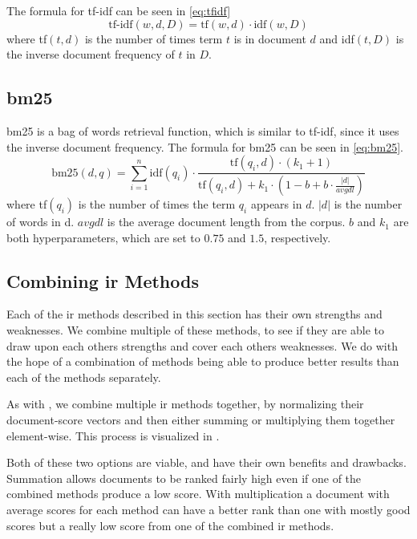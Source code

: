The formula for \gls{tf-idf} can be seen in \autoref{eq:tfidf}
\begin{equation}\label{eq:tfidf}
	\text{tf-idf}(w, d, D) = \text{tf}(w, d) \cdot \text{idf}(w, D)
\end{equation}
where tf$(t, d)$ is the number of times term $t$ is in document $d$ and idf$(t, D)$ is the inverse document frequency of $t$ in $D$.

\subsection{\acrlong{bm25}}
\gls{bm25} is a bag of words retrieval function, which is similar to \gls{tf-idf}, since it uses the inverse document frequency.
The formula for \gls{bm25} can be seen in \autoref{eq:bm25}\cite{bm25}.
\begin{equation}\label{eq:bm25}
	\text{bm25}(d, q) = \sum_{i=1}^{n}\text{idf}(q_i) \cdot \frac{\text{tf}(q_i, d) \cdot (k_1 + 1)}{\text{tf}(q_i, d) + k_1 \cdot (1 - b + b \cdot \frac{|d|}{avgdl})}
\end{equation}
where tf$(q_i)$ is the number of times the term $q_i$ appears in $d$.
$|d|$ is the number of words in d. 
$avgdl$ is the average document length from the corpus.
$b$ and $k_1$ are both hyperparameters, which are set to $0.75$ and $1.5$, respectively.

\subsection{Combining \gls{ir} Methods}
Each of the \gls{ir} methods described in this section has their own strengths and weaknesses.
We combine multiple of these methods, to see if they are able to draw upon each others strengths and cover each others weaknesses.
We do with the hope of a combination of methods being able to produce better results than each of the methods separately.

As with \citet{yang2009topic}, we combine multiple \gls{ir} methods together, by normalizing their document-score vectors and then either summing or multiplying them together element-wise.
This process is visualized in .


Both of these two options are viable, and have their own benefits and drawbacks.
Summation allows documents to be ranked fairly high even if one of the combined methods produce a low score.
With multiplication a document with average scores for each method can have a better rank than one with mostly good scores but a really low score from one of the combined \gls{ir} methods.
